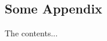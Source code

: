 \documentclass{iuphd}
\begin{document}
\tableofcontents
%



%
%
%
%
%
%	
%
%

%
%
\begin{appendices}
\chapter{Some Appendix}
The contents...
\end{appendices}



%
\end{document}
